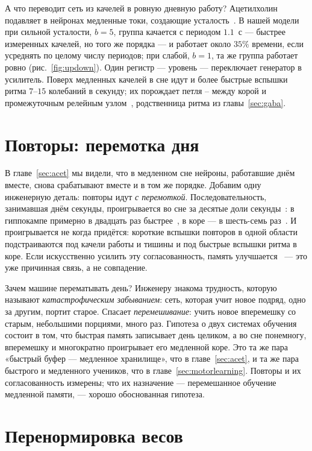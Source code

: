 А что переводит сеть из качелей в ровную дневную работу? Ацетилхолин подавляет в нейронах медленные токи, создающие усталость~\cite{McCormick1992}. В нашей модели при сильной усталости, $b=5$, группа качается с периодом $1.1$~с --- быстрее измеренных качелей, но того же порядка --- и работает около $35\%$ времени, если усреднять по целому числу периодов; при слабой, $b=1$, та же группа работает ровно (рис.~\ref{fig:updown}). Один регистр --- уровень  --- переключает генератор в усилитель. Поверх медленных качелей в сне идут и более быстрые вспышки ритма $7$--$15$ колебаний в секунду; их порождает петля -- между корой и промежуточным релейным узлом~\cite{SteriadeMcCormickSejnowski1993}, родственница ритма из главы~\ref{sec:gaba}.

\section{Повторы: перемотка дня}

В главе~\ref{sec:acet} мы видели, что в медленном сне нейроны, работавшие днём вместе, снова срабатывают вместе и в том же порядке. Добавим одну инженерную деталь: повторы идут \emph{с перемоткой}. Последовательность, занимавшая днём секунды, проигрывается во сне за десятые доли секунды~\cite{Nadasdy1999}: в гиппокампе примерно в двадцать раз быстрее~\cite{LeeWilson2002}, в коре --- в шесть-семь раз~\cite{Euston2007}. И проигрывается не когда придётся: короткие вспышки повторов в одной области подстраиваются под качели работы и тишины и под быстрые вспышки ритма в коре. Если искусственно усилить эту согласованность, память улучшается~\cite{Maingret2016} --- это уже причинная связь, а не совпадение.

Зачем машине перематывать день? Инженеру знакома трудность, которую называют \emph{катастрофическим забыванием}: сеть, которая учит новое подряд, одно за другим, портит старое. Спасает \emph{перемешивание}: учить новое вперемешку со старым, небольшими порциями, много раз. Гипотеза о двух системах обучения~\cite{McClelland1995} состоит в том, что быстрая память записывает день целиком, а во сне понемногу, вперемешку и многократно проигрывает его медленной коре. Это та же пара «быстрый буфер --- медленное хранилище», что в главе~\ref{sec:acet}, и та же пара быстрого и медленного учеников, что в главе~\ref{sec:motorlearning}. Повторы и их согласованность измерены; что их назначение --- перемешанное обучение медленной памяти, --- хорошо обоснованная гипотеза.

\section{Перенормировка весов}


